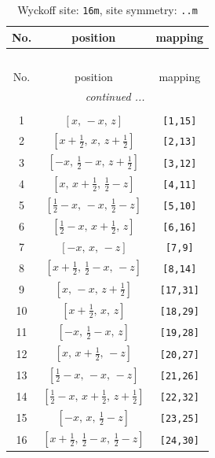 \documentclass[fleqn,8pt]{jsarticle}
\begin{document}
\renewcommand{\arraystretch}{1.2}
\begin{longtable}{ccc}
\caption{Wyckoff site: {\tt 16m}, site symmetry: {\tt ..m}}
 \\
 \hline \hline
No. & position & mapping \\ \hline \endfirsthead

\multicolumn{2}{l}{\tablename\ \thetable{}} \\
 \hline \hline
No. & position & mapping \\ \hline \endhead

 \hline \hline
\multicolumn{2}{r}{\footnotesize\it continued ...} \\ \endfoot

 \hline \hline
\multicolumn{2}{r}{} \\ \endlastfoot

1 & $\left[ x,\, - x,\, z \right]$ & {\tt [1,15]} \\ \hline
2 & $\left[ x + \frac{1}{2},\, x,\, z + \frac{1}{2} \right]$ & {\tt [2,13]} \\ \hline
3 & $\left[ - x,\, \frac{1}{2} - x,\, z + \frac{1}{2} \right]$ & {\tt [3,12]} \\ \hline
4 & $\left[ x,\, x + \frac{1}{2},\, \frac{1}{2} - z \right]$ & {\tt [4,11]} \\ \hline
5 & $\left[ \frac{1}{2} - x,\, - x,\, \frac{1}{2} - z \right]$ & {\tt [5,10]} \\ \hline
6 & $\left[ \frac{1}{2} - x,\, x + \frac{1}{2},\, z \right]$ & {\tt [6,16]} \\ \hline
7 & $\left[ - x,\, x,\, - z \right]$ & {\tt [7,9]} \\ \hline
8 & $\left[ x + \frac{1}{2},\, \frac{1}{2} - x,\, - z \right]$ & {\tt [8,14]} \\ \hline
9 & $\left[ x,\, - x,\, z + \frac{1}{2} \right]$ & {\tt [17,31]} \\ \hline
10 & $\left[ x + \frac{1}{2},\, x,\, z \right]$ & {\tt [18,29]} \\ \hline
11 & $\left[ - x,\, \frac{1}{2} - x,\, z \right]$ & {\tt [19,28]} \\ \hline
12 & $\left[ x,\, x + \frac{1}{2},\, - z \right]$ & {\tt [20,27]} \\ \hline
13 & $\left[ \frac{1}{2} - x,\, - x,\, - z \right]$ & {\tt [21,26]} \\ \hline
14 & $\left[ \frac{1}{2} - x,\, x + \frac{1}{2},\, z + \frac{1}{2} \right]$ & {\tt [22,32]} \\ \hline
15 & $\left[ - x,\, x,\, \frac{1}{2} - z \right]$ & {\tt [23,25]} \\ \hline
16 & $\left[ x + \frac{1}{2},\, \frac{1}{2} - x,\, \frac{1}{2} - z \right]$ & {\tt [24,30]} \\
\end{longtable}
\end{document}
